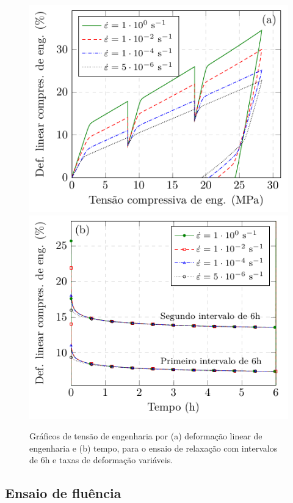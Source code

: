 \documentclass[Tese.tex]{subfiles}
\begin{document}
{\begin{figure}[!htb]
	\centering
	\caption{Gráficos de tensão de engenharia por (a) deformação linear de engenharia e (b) tempo, para o ensaio de relaxação com intervalos de $6$h e taxas de deformação variáveis.}
	\label{fig:ptfe-relaxation-2}
	\includegraphics[scale=1.0]{Figuras/PTFE/Relaxation-all-rates.pdf}\;\;\includegraphics[scale=1.0]{Figuras/PTFE/Relaxation-all-rates-s-6h.pdf}		
\end{figure}

\subsection{Ensaio de fluência}\label{subsec:ptfe-creep}

}
\end{document}
